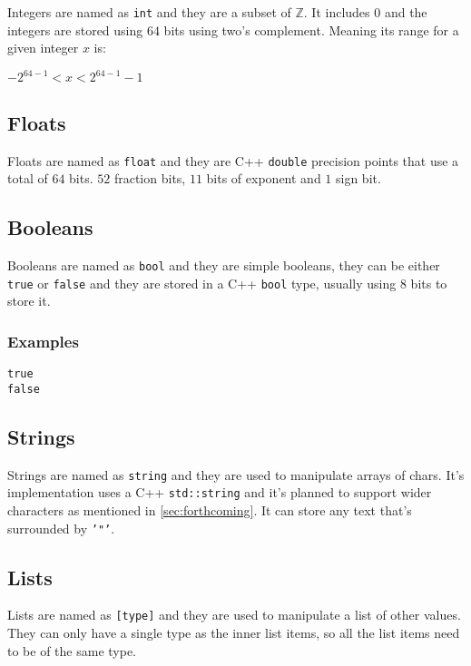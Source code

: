 Integers are named as \texttt{int} and they are a subset of $\mathbb{Z}$. It includes 0
and the integers are stored using $64$ bits using two's complement. Meaning its range for a given integer $x$ is:

\begin{center}
$-2^{64 - 1} < x < 2^{64 - 1} - 1$
\end{center}

\subsection{Floats}

Floats are named as \texttt{float} and they are C++ \texttt{double} precision points that use a total of $64$ bits. $52$ fraction bits, $11$ bits
of exponent and $1$ sign bit.

\subsection{Booleans}

Booleans are named as \texttt{bool} and they are simple booleans, they can be either \texttt{true} or \texttt{false} and they are stored in
a C++ \texttt{bool} type, usually using 8 bits to store it.

\subsubsection{Examples}

\begin{verbatim}
true
false
\end{verbatim}

\subsection{Strings}

Strings are named as \texttt{string} and they are used to manipulate arrays of chars. It's implementation uses
a C++ \texttt{std::string} and it's planned to support wider characters as mentioned in \autoref{sec:forthcoming}. It can store any text that's surrounded by \texttt{'"'}.

\subsection{Lists}

Lists are named as \texttt{[type]} and they are used to manipulate a list of other values. They can only have a single
type as the inner list items, so all the list items need to be of the same type.

